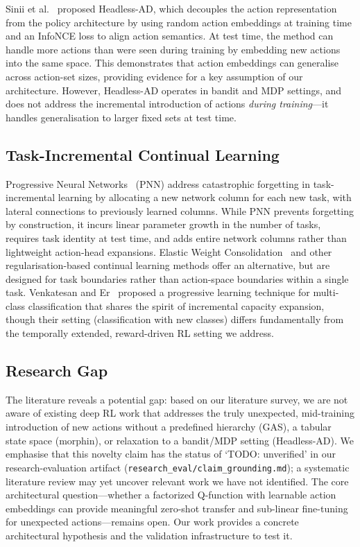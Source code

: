\documentclass{article}
\begin{document}
Sinii et al.~\cite{sinii2023headless} proposed Headless-AD, which decouples
the action representation from the policy architecture by using random action
embeddings at training time and an InfoNCE loss to align action semantics. At
test time, the method can handle more actions than were seen during training by
embedding new actions into the same space. This demonstrates that action
embeddings can generalise across action-set sizes, providing evidence for a key
assumption of our architecture. However, Headless-AD operates in bandit and
MDP settings, and does not address the incremental introduction of actions
\emph{during training}---it handles generalisation to larger fixed sets at
test time.

\subsection{Task-Incremental Continual Learning}

Progressive Neural Networks~\cite{rusu2016progressive} (PNN) address
catastrophic forgetting in task-incremental learning by allocating a new
network column for each new task, with lateral connections to previously
learned columns. While PNN prevents forgetting by construction, it incurs
linear parameter growth in the number of tasks, requires task identity at test
time, and adds entire network columns rather than lightweight action-head
expansions. Elastic Weight Consolidation~\cite{kirkpatrick2017overcoming} and
other regularisation-based continual learning methods offer an alternative, but
are designed for task boundaries rather than action-space boundaries within a
single task. Venkatesan and Er~\cite{venkatesan2016progressive} proposed a
progressive learning technique for multi-class classification that shares the
spirit of incremental capacity expansion, though their setting (classification
with new classes) differs fundamentally from the temporally extended,
reward-driven RL setting we address.

\subsection{Research Gap}

The literature reveals a potential gap: based on our literature survey, we are
not aware of existing deep RL work that addresses the truly unexpected,
mid-training introduction of new actions without a predefined hierarchy (GAS),
a tabular state space (morphin), or relaxation to a bandit/MDP setting
(Headless-AD). We emphasise that this novelty claim has the status of
`TODO: unverified' in our research-evaluation artifact
(\texttt{research\_eval/claim\_grounding.md}); a systematic literature review
may yet uncover relevant work we have not identified. The core architectural
question---whether a factorized Q-function with learnable action embeddings can
provide meaningful zero-shot transfer and sub-linear fine-tuning for unexpected
actions---remains open. Our work provides a concrete architectural hypothesis
and the validation infrastructure to test it.
\end{document}
